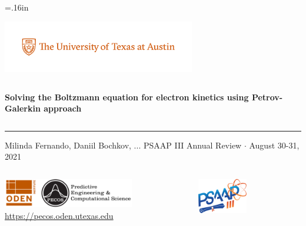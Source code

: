 \documentclass[mathserif, aspectratio=169]{beamer}
\begin{document}


\hoffset=.16in

\begin{frame}[plain,t]{}
\makeatletter
\includegraphics[height=0.9in,trim=50 40 40 0, clip]{PMSc_159_university_formal_horizontal.pdf} \newline
\begin{columns}[T,onlytextwidth]
{\bf \color{burntorange} \selectfont 
Solving the Boltzmann equation for electron kinetics using Petrov-Galerkin approach
}
\end{columns}
\vspace*{.15cm}
\rule{.8\textwidth}{0.6pt} \newline

\vspace*{0.05cm}
{\selectfont
  { \scriptsize
    Milinda Fernando, Daniil Bochkov, ...\newline
  }
  {\color{burntorange} \tiny
    PSAAP III Annual Review $\cdot$ August 30-31, 2021
  }
}

\vspace*{1cm}
\begin{columns}
\begin{column}{0.8\linewidth}
\includegraphics[height=0.5in]{oden_pecos_2020_wordmark.png}\\
{\scriptsize \url{https://pecos.oden.utexas.edu}}
\end{column}

\begin{column}{0.2\linewidth}
\includegraphics[height=0.6in]{psaap3-logo.png}
\end{column}
\end{columns}

\end{frame}
\hoffset=0in
\end{document}
